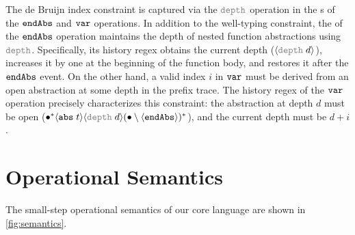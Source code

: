 The de Bruijn index constraint is captured via the $\eff{\textcolor{gray}{depth}}$ operation in the \tyName{}s of the $\boldsymbol{{\tt endAbs}}$ and $\boldsymbol{{\tt var}}$ operations. In addition to the well-typing constraint, the \tyName{} of the $\boldsymbol{{\tt endAbs}}$ operation maintains the depth of nested function abstractions using $\eff{\textcolor{gray}{depth}}$. Specifically, its history regex obtains the current depth ($\msgAGray{depth}{d}$), increases it by one at the beginning of the function body, and restores it after the $\boldsymbol{{\tt endAbs}}$ event.
On the other hand, a valid index $i$ in $\boldsymbol{{\tt var}}$ must be derived from an open abstraction at some depth in the prefix trace. The history regex of the $\boldsymbol{{\tt var}}$ operation precisely characterizes this constraint: the abstraction at depth $d$ must be open ($\allA\msgA{abs}{t}\msgAGray{depth}{d}(\anyA\setminus\msgC{endAbs})^*$), and the current depth must be $d + i$.

\section{Operational Semantics}\label{sec:tech:semantics}

The small-step operational semantics of our core language are shown in
\autoref{fig:semantics}.


